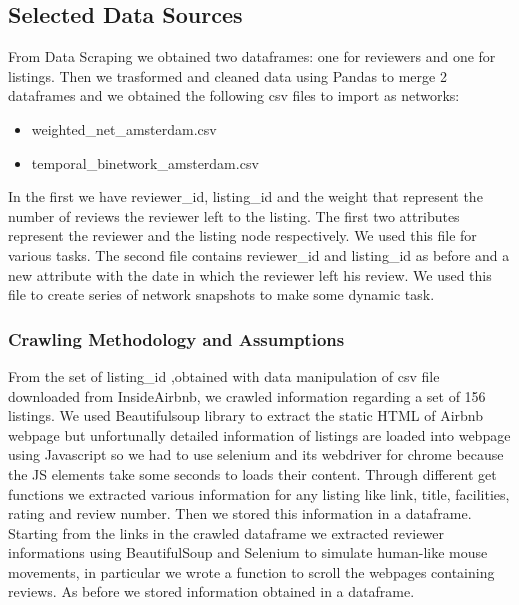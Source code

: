 \documentclass[sigchi]{acmart}
\begin{document}
\subsection{Selected Data Sources}

From Data Scraping we obtained two dataframes: one for reviewers and one for listings. \newline 
Then we trasformed and cleaned data using Pandas to merge 2 dataframes and we obtained the following csv files to import as networks:

\begin{itemize}
\item weighted\_net\_amsterdam.csv
\item temporal\_binetwork\_amsterdam.csv
\end{itemize}
In the first we have reviewer\_id, listing\_id and the weight that represent the number of reviews the reviewer left to the listing. The first two attributes represent the reviewer and the listing node respectively.
We used this file for various tasks. \newline
The second file contains reviewer\_id and listing\_id as before and a new attribute with the date in which the reviewer left his review. We used this file to create series of  network snapshots to make some dynamic task.


\subsubsection{\textbf{Crawling Methodology and Assumptions}}

From the set of listing\_id ,obtained with data manipulation of csv file downloaded from InsideAirbnb, we crawled information regarding a set of 156 listings. \newline
We used Beautifulsoup library to extract the static HTML of Airbnb webpage but unfortunally detailed information of listings are loaded into webpage using Javascript so we had to use selenium and its webdriver for chrome because the JS elements take some seconds to loads their content. Through different get functions we extracted various information for any listing like link, title, facilities, rating and review number. Then we stored this information in a dataframe. \newline
Starting from the links in the crawled dataframe  we extracted reviewer informations using BeautifulSoup and Selenium to simulate human-like mouse movements, in particular we wrote a function to scroll the webpages containing reviews.
As before we stored information obtained in a dataframe.
\end{document}
